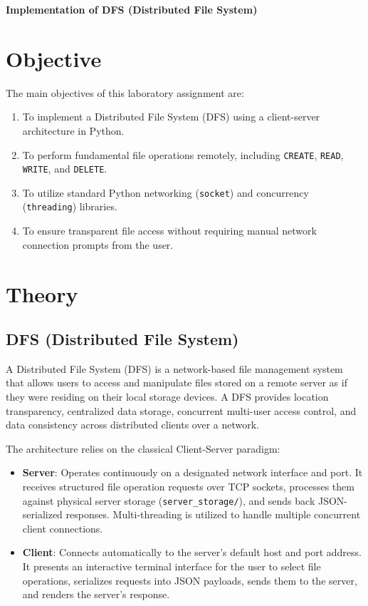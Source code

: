 \documentclass[main]{subfiles}
\begin{document}
{\centering
\Large \textbf{Implementation of DFS (Distributed File System)}\par
\vspace{0.4cm}
}

\section*{Objective}
The main objectives of this laboratory assignment are:
\begin{enumerate}
    \item To implement a Distributed File System (DFS) using a client-server architecture in Python.
    \item To perform fundamental file operations remotely, including \texttt{CREATE}, \texttt{READ}, \texttt{WRITE}, and \texttt{DELETE}.
    \item To utilize standard Python networking (\texttt{socket}) and concurrency (\texttt{threading}) libraries.
    \item To ensure transparent file access without requiring manual network connection prompts from the user.
\end{enumerate}

\section*{Theory}

\subsection*{DFS (Distributed File System)}
A Distributed File System (DFS) is a network-based file management system that allows users to access and manipulate files stored on a remote server as if they were residing on their local storage devices. A DFS provides location transparency, centralized data storage, concurrent multi-user access control, and data consistency across distributed clients over a network.

The architecture relies on the classical Client-Server paradigm:
\begin{itemize}
    \item \textbf{Server}: Operates continuously on a designated network interface and port. It receives structured file operation requests over TCP sockets, processes them against physical server storage (\texttt{server\_storage/}), and sends back JSON-serialized responses. Multi-threading is utilized to handle multiple concurrent client connections.
    \item \textbf{Client}: Connects automatically to the server's default host and port address. It presents an interactive terminal interface for the user to select file operations, serializes requests into JSON payloads, sends them to the server, and renders the server's response.
\end{itemize}
\end{document}
